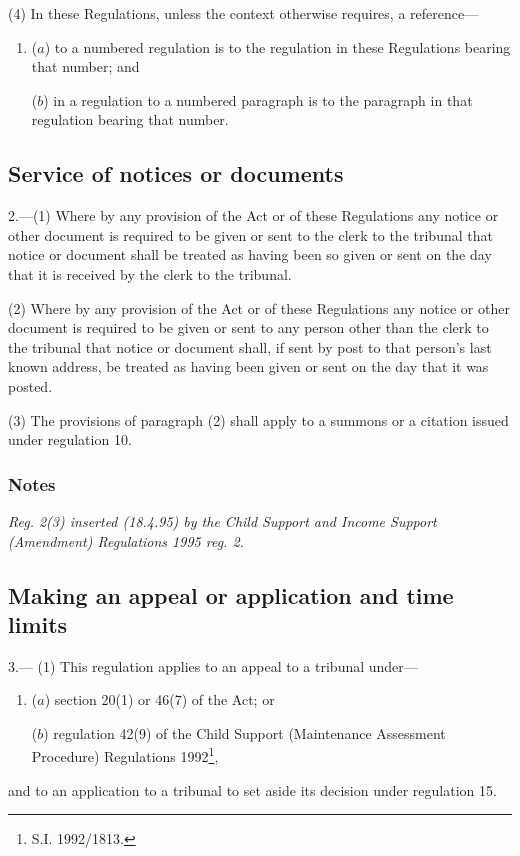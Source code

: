 \documentclass[a4paper]{article}
\newcommand\amendment[1]{\subsubsection*{Notes}{\itshape\frenchspacing\footnotesize #1 \par}}
\begin{document}
(4) In these Regulations, unless the context otherwise requires, a reference---
\begin{enumerate}\item[]
($a$) to a numbered regulation is to the regulation in these Regulations bearing that number; and

($b$) in a regulation to a numbered paragraph is to the paragraph in that regulation bearing that number.
\end{enumerate}

\subsection[2. Service of notices or documents]{Service of notices or documents}

2.—(1) Where by any provision of the Act or of these Regulations any notice or other document is required to be given or sent to the clerk to the tribunal that notice or document shall be treated as having been so given or sent on the day that it is received by the clerk to the tribunal.

(2) Where by any provision of the Act or of these Regulations any notice or other document is required to be given or sent to any person other than the clerk to the tribunal that notice or document shall, if sent by post to that person’s last known address, be treated as having been given or sent on the day that it was posted.

(3) The provisions of paragraph (2) shall apply to a summons or a citation issued under regulation 10.

\amendment{
Reg. 2(3) inserted (18.4.95) by the Child Support and Income Support (Amendment) Regulations 1995 reg. 2.
}

\subsection[3. Making an appeal or application and time limits]{Making an appeal or application and time limits}

3.—%
(1) This regulation applies to an appeal to a tribunal under—
\begin{enumerate}\item[]
($a$) section 20(1) or 46(7) of the Act; or

($b$) regulation 42(9) of the Child Support (Maintenance Assessment Procedure) Regulations 1992\footnote{\frenchspacing S.I. 1992/1813.},
\end{enumerate}
and to an application to a tribunal to set aside its decision under regulation 15.
\end{document}
